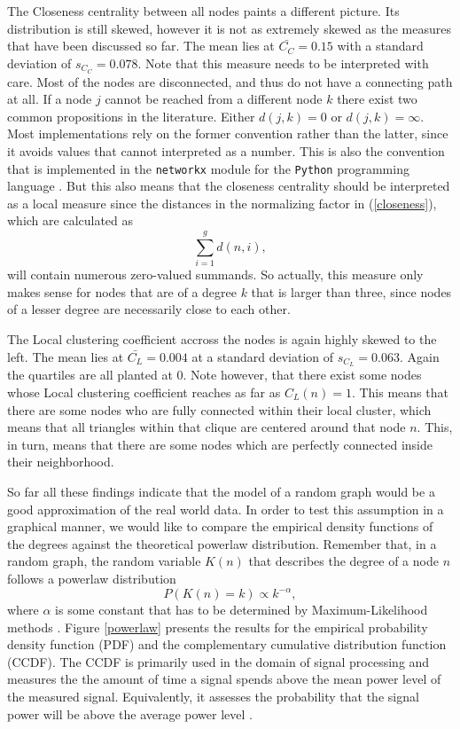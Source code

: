 The Closeness centrality between all nodes paints a different picture. Its distribution is still skewed, however it is not as extremely skewed as the measures that have been discussed so far. 
The mean lies at $\bar{C_C}=0.15$ with a standard deviation of $s_{C_C} = 0.078$. 
Note that this measure needs to be interpreted with care. 
Most of the nodes are disconnected, and thus do not have a connecting path at all. 
If a node $j$ cannot be reached from a different node $k$ there exist two common propositions in the literature. 
Either $d(j, k) = 0$ or $d(j, k)=\infty$. 
Most implementations rely on the former convention rather than the latter, since it avoids values that cannot interpreted as a number. This is also the convention that is implemented in the \texttt{networkx} module for the \texttt{Python} programming language \cite{networkx}. But this also means that the closeness centrality should be interpreted as a local measure since the distances in the normalizing factor in (\ref{closeness}), which are calculated as $$\sum\limits_{i=1}^g d(n, i),$$ will contain numerous zero-valued summands. So actually, this measure only makes sense for nodes that are of a degree $k$ that is larger than three, since nodes of a lesser degree are necessarily close to each other.

The Local clustering coefficient accross the nodes is again highly skewed to the left. The mean lies at $\bar{C_L}=0.004$ at a standard deviation of $s_{C_L}=0.063$. Again the quartiles are all planted at $0$. Note however, that there exist some nodes whose Local clustering coefficient reaches as far as $C_L(n)=1$. This means that there are some nodes who are fully connected within their local cluster, which means that all triangles within that clique are centered around that node $n$. This, in turn, means that there are some nodes which are perfectly connected inside their neighborhood.

So far all these findings indicate that the model of a random graph would be a good approximation of the real world data. In order to test this assumption in a graphical manner, we would like to compare the empirical density functions of the degrees against the theoretical powerlaw distribution. Remember that, in a random graph, the random variable $K(n)$ that describes the degree of a node $n$ follows a powerlaw distribution $$P(K(n)=k)\propto k^{-\alpha},$$ where $\alpha$ is some constant that has to be determined by Maximum-Likelihood methods \cite{graphintro}. Figure \ref{powerlaw} presents the results for the empirical probability density function (PDF) and the complementary cumulative distribution function (CCDF). The CCDF is primarily used in the domain of signal processing and measures the the amount of time a signal spends above the mean power level of the measured signal. Equivalently, it assesses the probability that the signal power will be above the average power level \cite{ccdf2015}.


